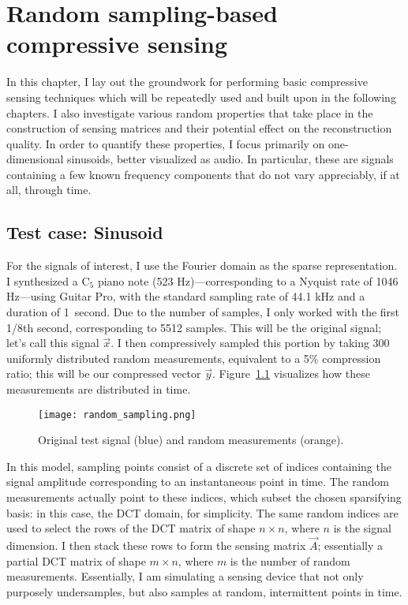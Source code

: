 \chapter{Random sampling-based compressive sensing}
\label{chap:audio-cs}

In this chapter, I lay out the groundwork for performing basic compressive sensing techniques which will be repeatedly used and built upon in the following chapters. I also investigate various random properties that take place in the construction of sensing matrices and their potential effect on the reconstruction quality. In order to quantify these properties, I focus primarily on one-dimensional sinusoids, better visualized as audio. In particular, these are signals containing a few known frequency components that do not vary appreciably, if at all, through time.

\section{Test case: Sinusoid}
\label{sec:1dsin}
For the signals of interest, I use the Fourier domain as the sparse representation. I synthesized a C$_5$ piano note (523 Hz)---corresponding to a Nyquist rate of 1046 Hz---using Guitar Pro, with the standard sampling rate of 44.1 kHz and a duration of 1~second. Due to the number of samples, I only worked with the first 1/8th second, corresponding to 5512 samples. This will be the original signal; let's call this signal $\vec{x}$. I then compressively sampled this portion by taking 300 uniformly distributed random measurements, equivalent to a 5\% compression ratio; this will be our compressed vector $\vec{y}$. Figure~\ref{fig:random-sampling} visualizes how these measurements are distributed in time.

\begin{figure}[htb]
	\texttt{[image: random\_sampling.png]}
	\caption{Original test signal (blue) and random measurements (orange).}
	\label{fig:random-sampling}
\end{figure}

In this model, sampling points consist of a discrete set of indices containing the signal amplitude corresponding to an instantaneous point in time. The random measurements actually point to these indices, which subset the chosen sparsifying basis: in this case, the DCT domain, for simplicity. The same random indices are used to select the rows of the DCT matrix of shape $n \times n$, where $n$ is the signal dimension. I then stack these rows to form the sensing matrix $\vec{A}$; essentially a partial DCT matrix of shape $m \times n$, where $m$ is the number of random measurements. Essentially, I am simulating a sensing device that not only purposely undersamples, but also samples at random, intermittent points in time.

